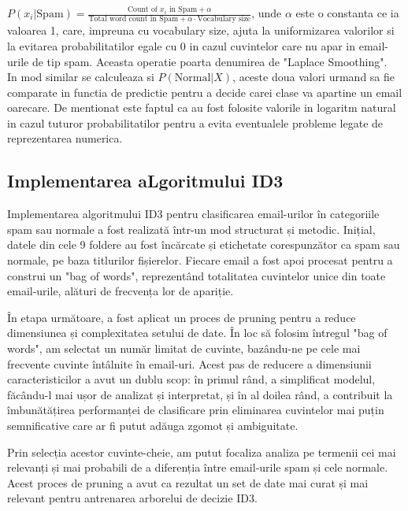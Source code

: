 \documentclass{article}
\begin{document}
    $P(x_i | \text{Spam}) = \frac{{\text{Count of } x_i \text{ in Spam} + \alpha}}{{\text{Total word count in Spam} + \alpha \cdot \text{Vocabulary size}}}$, unde $\alpha$ este o constanta ce ia valoarea 1, care, impreuna cu vocabulary size, ajuta la uniformizarea valorilor si la evitarea probabilitatilor egale cu 0 in cazul cuvintelor care nu apar in email-urile de tip spam. Aceasta operatie poarta denumirea de "Laplace Smoothing".
    \\ 
    In mod similar se calculeaza si $ P(\text{Normal} | X)$, aceste doua valori urmand sa fie comparate in functia de predictie pentru a decide carei clase va apartine un email oarecare. De mentionat este faptul ca au fost folosite valorile in logaritm natural in cazul tuturor probabilitatilor pentru a evita eventualele probleme legate de reprezentarea numerica.



\subsection{Implementarea aLgoritmului ID3}
Implementarea algoritmului ID3 pentru clasificarea email-urilor în categoriile spam sau normale a fost realizată într-un mod structurat și metodic. Inițial, datele din cele 9 foldere au fost încărcate și etichetate corespunzător ca spam sau normale, pe baza titlurilor fișierelor. Fiecare email a fost apoi procesat pentru a construi un "bag of words", reprezentând totalitatea cuvintelor unice din toate email-urile, alături de frecvența lor de apariție.

În etapa următoare, a fost aplicat un proces de pruning pentru a reduce dimensiunea și complexitatea setului de date. În loc să folosim întregul "bag of words", am selectat un număr limitat de cuvinte, bazându-ne pe cele mai frecvente cuvinte întâlnite în email-uri. Acest pas de reducere a dimensiunii caracteristicilor a avut un dublu scop: în primul rând, a simplificat modelul, făcându-l mai ușor de analizat și interpretat, și în al doilea rând, a contribuit la îmbunătățirea performanței de clasificare prin eliminarea cuvintelor mai puțin semnificative care ar fi putut adăuga zgomot și ambiguitate.

Prin selecția acestor cuvinte-cheie, am putut focaliza analiza pe termenii cei mai relevanți și mai probabili de a diferenția între email-urile spam și cele normale. Acest proces de pruning a avut ca rezultat un set de date mai curat și mai relevant pentru antrenarea arborelui de decizie ID3.
\end{document}
